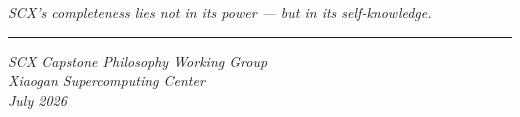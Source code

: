 \documentclass[12pt,a4paper]{article}
\theoremstyle{plain}
\theoremstyle{definition}
\theoremstyle{remark}
\begin{document}
\begin{center}
\large\textit{SCX's completeness lies not in its power --- but in its self-knowledge.}
\end{center}
\vspace{24pt}
\begin{center}
\rule{0.5\textwidth}{0.4pt}
\end{center}
\vspace{12pt}
\begin{center}
\textit{SCX Capstone Philosophy Working Group}\\[4pt]
\textit{Xiaogan Supercomputing Center}\\[4pt]
\textit{July 2026}
\end{center}
\newpage
\end{document}
